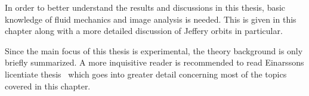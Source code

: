 In order to better understand the results and discussions in this thesis, basic knowledge of fluid mechanics and image analysis is needed. This is given in this chapter along with a more detailed discussion of Jeffery orbits in particular. 

Since the main focus of this thesis is experimental, the theory background is only briefly summarized. A more inquisitive reader is recommended to read Einarssons licentiate thesis~\cite{JonasLic} which goes into greater detail concerning most of the topics covered in this chapter.